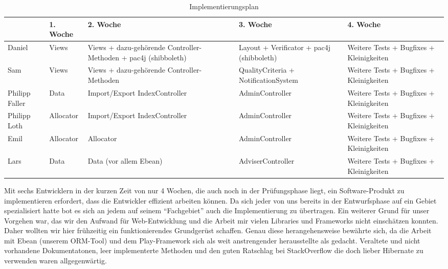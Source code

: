\documentclass[parskip=full]{scrartcl}
\begin{document}
\begin{table}[H]
\begin{tabularx}{\textwidth}{|l|l|X|X|X|}
\hline
 	& 1. Woche			& 2. Woche		& 3. Woche & 4. Woche\\
\hline 
Daniel	& Views			& Views + dazu-gehörende Controller-Methoden + pac4j 
(shibboleth) & Layout + Verificator
+ pac4j (shibboleth)& Weitere Tests +
Bugfixes +
Kleinigkeiten\\
\hline
Sam & Views&Views +
dazu-gehörende
Controller-
Methoden & QualityCriteria +
NotificationSystem & Weitere Tests +
Bugfixes +
Kleinigkeiten\\
\hline
Philipp Faller&Data&Import/Export
IndexController&AdminController&Weitere Tests +
Bugfixes +
Kleinigkeiten\\
\hline
Philipp Loth&Allocator&Import/Export
IndexController&AdminController&Weitere Tests +
Bugfixes +
Kleinigkeiten\\
\hline
Emil&Allocator&Allocator&AdminController&Weitere Tests +
Bugfixes +
Kleinigkeiten\\
\hline
Lars&Data&Data (vor allem
Ebean)&AdviserController&Weitere Tests +
Bugfixes +
Kleinigkeiten\\
\hline
\end{tabularx}
\caption{Implementierungsplan}
\end{table}
Mit sechs Entwicklern in der kurzen Zeit von nur 4 Wochen, die auch noch in der
Prüfungsphase liegt, ein Software-Produkt zu implementieren erfordert, dass die
Entwickler effizient arbeiten können. Da sich jeder von uns bereits in der
Entwurfsphase auf ein Gebiet spezialisiert hatte bot es sich an jedem auf seinem
\enquote{Fachgebiet} auch die Implementierung zu übertragen. 
Ein weiterer Grund für unser Vorgehen war, das wir den Aufwand für
Web-Entwicklung und die Arbeit mir vielen Libraries und Frameworks 
nicht einschätzen konnten. Daher
wollten wir hier frühzeitig ein funktionierendes Grundgerüst schaffen.
Genau diese herangehensweise bewährte sich, da die Arbeit mit Ebean (unserem
ORM-Tool) und dem Play-Framework sich als weit anstrengender herausstellte als
gedacht. Veraltete und nicht vorhandene Dokumentatonen, leer implementerte
Methoden und den guten Ratschlag bei StackOverflow die doch
lieber Hibernate zu verwenden waren allgegenwärtig.
\end{document}
